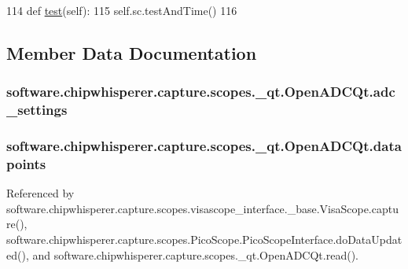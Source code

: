 \begin{DoxyCode}
114     \textcolor{keyword}{def }\hyperlink{classsoftware_1_1chipwhisperer_1_1capture_1_1scopes_1_1__qt_1_1OpenADCQt_ac03faf31164e0319be5835a53a603463}{test}(self):
115         self.sc.testAndTime()
116 
\end{DoxyCode}


\subsection{Member Data Documentation}
\hypertarget{classsoftware_1_1chipwhisperer_1_1capture_1_1scopes_1_1__qt_1_1OpenADCQt_af3293a80ce611c2d0c7aa2d376b48d76}{}
\subsubsection[{adc\+\_\+settings}]{\setlength{\rightskip}{0pt plus 5cm}software.\+chipwhisperer.\+capture.\+scopes.\+\_\+qt.\+Open\+A\+D\+C\+Qt.\+adc\+\_\+settings}\label{classsoftware_1_1chipwhisperer_1_1capture_1_1scopes_1_1__qt_1_1OpenADCQt_af3293a80ce611c2d0c7aa2d376b48d76}
\hypertarget{classsoftware_1_1chipwhisperer_1_1capture_1_1scopes_1_1__qt_1_1OpenADCQt_a02df067508d7c2f510d4bdfc3019f9b6}{}
\subsubsection[{datapoints}]{\setlength{\rightskip}{0pt plus 5cm}software.\+chipwhisperer.\+capture.\+scopes.\+\_\+qt.\+Open\+A\+D\+C\+Qt.\+datapoints}\label{classsoftware_1_1chipwhisperer_1_1capture_1_1scopes_1_1__qt_1_1OpenADCQt_a02df067508d7c2f510d4bdfc3019f9b6}


Referenced by software.\+chipwhisperer.\+capture.\+scopes.\+visascope\+\_\+interface.\+\_\+base.\+Visa\+Scope.\+capture(), software.\+chipwhisperer.\+capture.\+scopes.\+Pico\+Scope.\+Pico\+Scope\+Interface.\+do\+Data\+Updated(), and software.\+chipwhisperer.\+capture.\+scopes.\+\_\+qt.\+Open\+A\+D\+C\+Qt.\+read().

